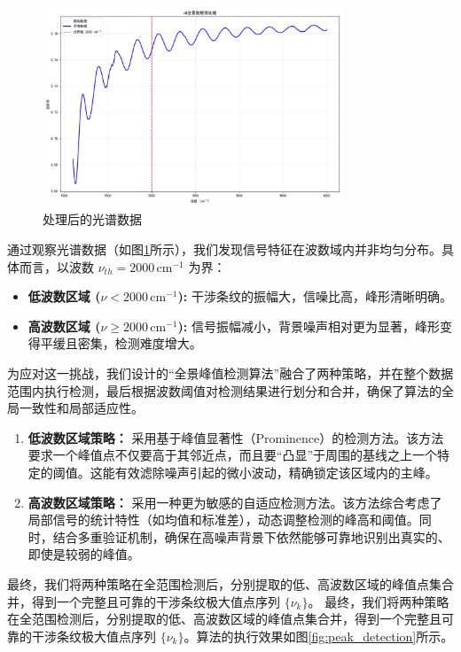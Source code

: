 \documentclass[withoutpreface,bwprint]{cumcmthesis} %
\begin{document}
\begin{figure}
    \centering
    \includegraphics[width=0.8\textwidth]{figures/smoothing.png}
    \caption{处理后的光谱数据}
    \label{fig:smoothing}
\end{figure}

通过观察光谱数据（如图\ref{fig:smoothing}所示），我们发现信号特征在波数域内并非均匀分布。具体而言，以波数 $\nu_{th} = 2000 \, \text{cm}^{-1}$ 为界：
\begin{itemize}
    \item \textbf{低波数区域 ($\nu < 2000 \, \text{cm}^{-1}$):} 干涉条纹的振幅大，信噪比高，峰形清晰明确。
    \item \textbf{高波数区域 ($\nu \ge 2000 \, \text{cm}^{-1}$):} 信号振幅减小，背景噪声相对更为显著，峰形变得平缓且密集，检测难度增大。
\end{itemize}

为应对这一挑战，我们设计的“全景峰值检测算法”融合了两种策略，并在整个数据范围内执行检测，最后根据波数阈值对检测结果进行划分和合并，确保了算法的全局一致性和局部适应性。
\begin{enumerate}
    \item \textbf{低波数区域策略：} 采用基于峰值显著性（Prominence）的检测方法。该方法要求一个峰值点不仅要高于其邻近点，而且要“凸显”于周围的基线之上一个特定的阈值。这能有效滤除噪声引起的微小波动，精确锁定该区域内的主峰。
    \item \textbf{高波数区域策略：} 采用一种更为敏感的自适应检测方法。该方法综合考虑了局部信号的统计特性（如均值和标准差），动态调整检测的峰高和阈值。同时，结合多重验证机制，确保在高噪声背景下依然能够可靠地识别出真实的、即使是较弱的峰值。
\end{enumerate}
最终，我们将两种策略在全范围检测后，分别提取的低、高波数区域的峰值点集合并，得到一个完整且可靠的干涉条纹极大值点序列 $\{\nu_k\}$。
最终，我们将两种策略在全范围检测后，分别提取的低、高波数区域的峰值点集合并，得到一个完整且可靠的干涉条纹极大值点序列 $\{\nu_k\}$。算法的执行效果如图\ref{fig:peak_detection}所示。
\end{document}
